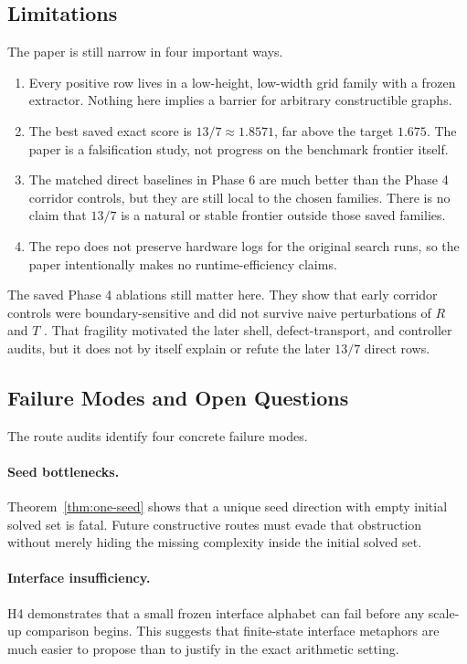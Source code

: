 \documentclass[11pt]{article}
\theoremstyle{definition}
\begin{document}
\subsection{Limitations}

The paper is still narrow in four important ways.

\begin{enumerate}
  \item Every positive row lives in a low-height, low-width grid family with a frozen extractor. Nothing here implies a barrier for arbitrary constructible graphs.
  \item The best saved exact score is $13/7\approx 1.8571$, far above the target $1.675$. The paper is a falsification study, not progress on the benchmark frontier itself.
  \item The matched direct baselines in Phase 6 are much better than the Phase 4 corridor controls, but they are still local to the chosen families. There is no claim that $13/7$ is a natural or stable frontier outside those saved families.
  \item The repo does not preserve hardware logs for the original search runs, so the paper intentionally makes no runtime-efficiency claims.
\end{enumerate}

The saved Phase 4 ablations still matter here. They show that early corridor controls were boundary-sensitive and did not survive naive perturbations of $R$ and $T$ \citep{archivara_ablations}. That fragility motivated the later shell, defect-transport, and controller audits, but it does not by itself explain or refute the later $13/7$ direct rows.

\subsection{Failure Modes and Open Questions}

The route audits identify four concrete failure modes.

\paragraph{Seed bottlenecks.}
Theorem~\ref{thm:one-seed} shows that a unique seed direction with empty initial solved set is fatal. Future constructive routes must evade that obstruction without merely hiding the missing complexity inside the initial solved set.

\paragraph{Interface insufficiency.}
H4 demonstrates that a small frozen interface alphabet can fail before any scale-up comparison begins. This suggests that finite-state interface metaphors are much easier to propose than to justify in the exact arithmetic setting.
\end{document}
